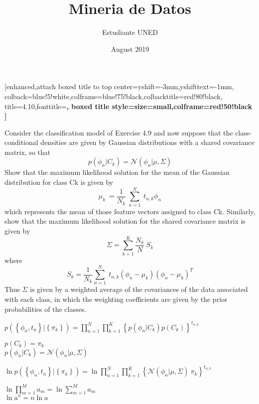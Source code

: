 \documentclass{article}
\title{Mineria de Datos}
\author{Estudiante UNED }
\date{August 2019}
\begin{document}
\maketitle

\begin {tcolorbox}
    [enhanced,attach boxed title to top center={yshift=-3mm,yshifttext=-1mm}, colback=blue!5!white,colframe=blue!75!black,colbacktitle=red!80!black, title=4.10,fonttitle=\bfseries, boxed title style={size=small,colframe=red!50!black} ]
  
Consider the classification model of Exercise 4.9 and now suppose that the class-conditional densities are given by Gaussian distributions with a shared covariance matrix, so that 
        $$ p\left(\phi_n|C_k\right)=\mathcal{N}\left(\phi_n|\mu,\Sigma\right) $$
Show that the maximum likelihood solution for the mean of the Gaussian distribution for class Ck is given by
        $$ \mu_k\ =\frac{1}{N_k}\ \sum_{n=1}^{N}{\ t_{n,k}\phi_n} $$
which represents the mean of those feature vectors assigned to class Ck. Similarly, show that the maximum likelihood solution for the shared covariance matrix is given by
        $$ \Sigma=\sum_{k=1}^{K}{\frac{N_k}{N}\ S_k} $$
where
        $$ S_k=\frac{1}{N_k}\sum_{n=1}^{N}{\ t_{n,k}\left(\phi_n-\mu_k\right)\left(\phi_n-\mu_k\right)^T} $$
Thus $\Sigma$ is given by a weighted average of the covariances of the data associated with each class, in which the weighting coefficients are given by the prior probabilities of the classes.
\end{tcolorbox}

$ \displaystyle
   p\left(\left\{\phi_n ,t_n\right\}|\left\{\pi_k\right\}\right)=
   \prod_{n=1}^{N}{
        \prod_{k=1}^{K}{
            \left\{p\left(\phi_n|C_k\right) p\left(C_k\right)\right\}^{t_{n,k}} 
        }
    }
$
\begin{center}
    $ \displaystyle p\left(C_k\right)=\pi_k $ \\
    $ \displaystyle p\left(\phi_n|C_k\right)=\mathcal{N}\left(\phi_n|\mu,\Sigma\right) $
\end{center}

$ \displaystyle
    \ln{p\left(\left\{\phi_n,t_n\right\}|\left\{\pi_k\right\}\right)}=\ln{
        \prod_{n=1}^{N}{
            \prod_{k=1}^{K}{
                \left\{\mathcal{N}\left(\phi_n|\mu,\Sigma\right)\ \pi_k\right\}^{t_{n,k}}
                }\
            }
        }
$
\begin{center}
    $ \displaystyle \ln{\prod_{m=1}^{M}a_m}=\ln{\sum_{m=1}^{M}a_m} $ \\
    $ \displaystyle \ln{a^n}=n\ln{a} $
\end{center}
\end{document}

